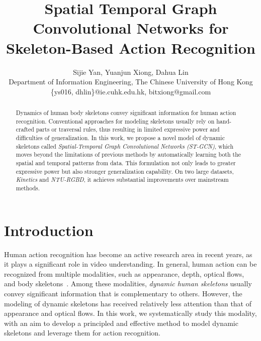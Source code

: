 \documentclass[letterpaper]{article} %
\begin{document}
\title{Spatial Temporal Graph Convolutional Networks for Skeleton-Based Action Recognition}
\author{Sijie Yan, Yuanjun Xiong, Dahua Lin\\
Department of Information Engineering, The Chinese University of Hong Kong\\
\{ys016, dhlin\}@ie.cuhk.edu.hk, bitxiong@gmail.com\\
}
\maketitle

\begin{abstract}

Dynamics of human body skeletons convey significant information
for human action recognition. Conventional approaches for modeling
skeletons usually rely on hand-crafted parts or traversal rules,
thus resulting in limited expressive power and difficulties
of generalization.
In this work, we propose a novel model of dynamic skeletons
called \emph{Spatial-Temporal Graph Convolutional Networks (ST-GCN)},
which moves beyond the limitations of previous methods by
automatically learning both the spatial and temporal patterns from data.
This formulation not only leads to greater expressive power
but also stronger generalization capability.
On two large datasets,
\emph{Kinetics} and \emph{NTU-RGBD}, it achieves substantial
improvements over mainstream methods.

\end{abstract}

\section{Introduction}

Human action recognition has become an active research area in recent years,
as it plays a significant role in video understanding.
In general, human action can be recognized from multiple modalities\cite{Simonyan2014NIPS,Tran2015C3D,Wang2015action,TSN2016ECCV,SSN2017ICCV},
such as appearance, depth, optical flows, and body skeletons~\cite{Du2015CVPR,Liu2016ECCV}.
Among these modalities, \emph{dynamic human skeletons} usually convey
significant information that is complementary to others.
However, the modeling of dynamic skeletons has received relatively less
attention than that of appearance and optical flows.
In this work, we systematically study this modality, with an aim to
develop a principled and effective method to model dynamic skeletons
and leverage them for action recognition.
\end{document}
